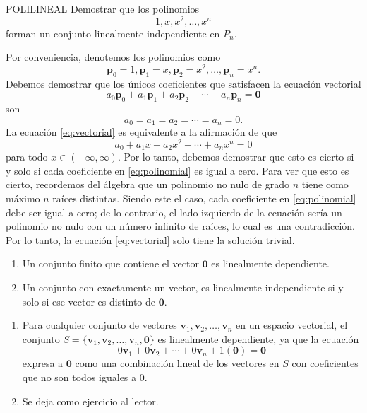 \begin{examplebox}{}{POLILINEAL}
    Demostrar que los polinomios
    $$1, x, x^2, \dots, x^n$$
    forman un conjunto linealmente independiente en $P_n$.

    \tcblower
    \solucion Por conveniencia, denotemos los polinomios como
    $$\mathbf{p}_0 = 1, \mathbf{p}_1 = x, \mathbf{p}_2 = x^2, \dots, \mathbf{p}_n = x^n.$$
    Debemos demostrar que los únicos coeficientes que satisfacen la ecuación vectorial
    \begin{equation}
        a_0\mathbf{p}_0 + a_1\mathbf{p}_1 + a_2\mathbf{p}_2 + \cdots + a_n\mathbf{p}_n = \mathbf{0} \label{eq:vectorial}
    \end{equation}
    son
    $$a_0 = a_1 = a_2 = \cdots = a_n = 0.$$
    La ecuación \eqref{eq:vectorial} es equivalente a la afirmación de que
    \begin{equation}
        a_0 + a_1x + a_2x^2 + \cdots + a_nx^n = 0 \label{eq:polinomial}
    \end{equation}
    para todo $x \in (-\infty, \infty)$. Por lo tanto, debemos demostrar que esto es cierto si y solo si cada coeficiente en \eqref{eq:polinomial} es igual a cero. Para ver que esto es cierto, recordemos del álgebra que un polinomio no nulo de grado $n$ tiene como máximo $n$ raíces distintas. Siendo este el caso, cada coeficiente en \eqref{eq:polinomial} debe ser igual a cero; de lo contrario, el lado izquierdo de la ecuación sería un polinomio no nulo con un número infinito de raíces, lo cual es una contradicción. Por lo tanto, la ecuación \eqref{eq:vectorial} solo tiene la solución trivial.
\end{examplebox}

\newpage

\begin{theorem}{}{}
    \begin{enumerate}[label=\roman*), topsep=6pt, itemsep=0pt]
        \item Un conjunto finito que contiene el vector $\mathbf{0}$ es linealmente dependiente.
        \item Un conjunto con exactamente un vector, es linealmente independiente si y solo si ese vector es distinto de $\mathbf{0}$.
    \end{enumerate}

    \tcblower
    \demostracion
    \begin{enumerate}[label=\roman*), topsep=6pt, itemsep=0pt]
        \item Para cualquier conjunto de vectores $\mathbf{v}_1, \mathbf{v}_2, \dots, \mathbf{v}_n$ en un espacio vectorial, el conjunto $S = \{\mathbf{v}_1, \mathbf{v}_2, \dots, \mathbf{v}_n, \mathbf{0}\}$ es linealmente dependiente, ya que la ecuación
        $$0\mathbf{v}_1 + 0\mathbf{v}_2 + \cdots + 0\mathbf{v}_n + 1(\mathbf{0}) = \mathbf{0}$$
        expresa a $\mathbf{0}$ como una combinación lineal de los vectores en $S$ con coeficientes que no son todos iguales a $0$.
        \item Se deja como ejercicio al lector.
    \end{enumerate}
\end{theorem}


